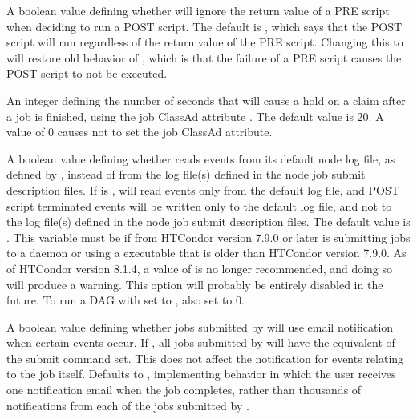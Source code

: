 \begin{description}
\label{param:DAGmanAlwaysRunPost}
\item[\Macro{DAGMAN\_ALWAYS\_RUN\_POST}]
  A boolean value defining whether  will ignore the return value
  of a PRE script when deciding to run a POST script.  The default is
  , which says that the POST script will run regardless of the return
  value of the PRE script. Changing this to  will restore old
  behavior of , which is that the failure of a PRE script causes
  the POST script to not be executed.

\label{param:DAGmanHoldClaimTime}
\item[\Macro{DAGMAN\_HOLD\_CLAIM\_TIME}]
  An integer defining the number of seconds that  will cause a
  hold on a claim after a job is finished, 
  using the job ClassAd attribute .
  The default value is 20. 
  A value of 0 causes  not to set the job ClassAd attribute.

\label{param:DAGmanAlwaysUseNodeLog}
\item[\Macro{DAGMAN\_ALWAYS\_USE\_NODE\_LOG}]
  A boolean value defining whether  reads events from
  its default node log file, as defined by
  , instead of from the log file(s)
  defined in the node job submit description files.
  If  is ,
   will read events only from the default log
  file, and POST script terminated events will
  be written only to the default log file, and not to the
  log file(s) defined in the node job submit description files.
  The default value is .
  This variable must be  if  from HTCondor
  version 7.9.0 or later is submitting jobs to a  daemon
  or using a  executable that is older than 
  HTCondor version 7.9.0.
  As of HTCondor version 8.1.4, a value of  is no longer 
  recommended, and doing so will produce a warning.  This
  option will probably be entirely disabled in the future.
  To run a DAG with  
  set to ,
  also set  to 0.

\label{param:DAGmanSuppressNotification}
\item[\Macro{DAGMAN\_SUPPRESS\_NOTIFICATION}]
  A boolean value defining whether jobs submitted by  will use
  email notification when certain events occur.  
  If , 
  all jobs submitted by  will have the equivalent of the
  submit command  set. 
  This does not affect the notification for events relating to 
  the  job itself. 
  Defaults to , implementing behavior in which the user
  receives one notification email when the  job completes,
  rather than thousands of notifications from each of the jobs submitted by
  . 


\end{description}
